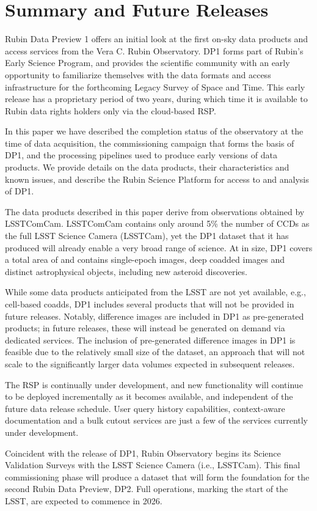 \section{Summary and Future Releases}
\label{sec:summary}

Rubin Data Preview 1 offers an initial look at the first on-sky data products and access services from the Vera C. Rubin Observatory. \gls{DP1} forms part of Rubin's Early Science Program, and provides the scientific community with an early opportunity to familiarize themselves with the data formats and access infrastructure for the forthcoming Legacy Survey of Space and Time.
This early release has a proprietary period of two years, during which time it is  available to Rubin data rights holders only via the cloud-based \gls{RSP}.

In this paper we have described the completion status of the observatory at the time of data acquisition, the commissioning campaign that forms the basis of \gls{DP1}, and the processing pipelines used to produce early versions of data products.
We provide details on the data products, their characteristics and known issues, and describe the Rubin Science Platform for access to and analysis of \gls{DP1}.

The data products described in this paper derive from observations obtained by \gls{LSSTComCam}. \gls{LSSTComCam} contains only around 5\% the number of CCDs as the full LSST Science Camera (\gls{LSSTCam}), yet the \gls{DP1} dataset that it has produced will already enable a very broad range of science.
At \sizeinbytes in size, \gls{DP1} covers a total area of \totalarea and contains \nexposures single-epoch images, \ndeepcoadds deep coadded images and \nobjects distinct astrophysical objects, including  \nnewasteroiddiscoveries  new asteroid discoveries.

While some data products anticipated from the \gls{LSST} are not yet available, e.g., cell-based coadds, \gls{DP1} includes several products that will not be provided in future releases.
Notably, difference images are included in \gls{DP1} as pre-generated products; in future releases, these will instead be generated on demand via dedicated services.
The inclusion of pre-generated difference images in \gls{DP1} is feasible due to the relatively small size of the dataset, an approach that will not scale to the significantly larger data volumes expected in subsequent releases.

The \gls{RSP} is continually under development, and new functionality will continue to be deployed incrementally as it becomes available, and independent of the future data release schedule.
User query history capabilities, context-aware documentation and a bulk cutout services are just a few of the services currently under development.

Coincident with the release of \gls{DP1}, Rubin Observatory begins its Science Validation Surveys with the LSST Science Camera (i.e., \gls{LSSTCam}).
This final commissioning phase will produce a dataset that will form the foundation for the second Rubin Data Preview, \gls{DP2}.
Full operations, marking the start of the \gls{LSST}, are expected to commence in 2026.